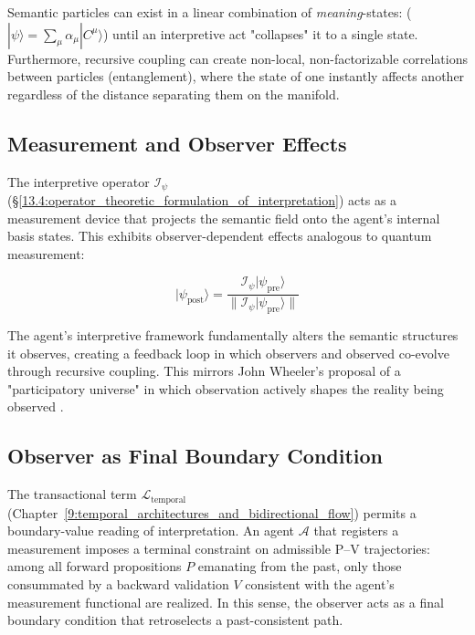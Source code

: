 Semantic particles can exist in a linear combination of \textit{meaning}-states: (\(|\psi\rangle = \sum_\mu \alpha_\mu |C^\mu\rangle\)) until an interpretive act "collapses" it to a single state. Furthermore, recursive coupling can create non-local, non-factorizable correlations between particles (entanglement), where the state of one instantly affects another regardless of the distance separating them on the manifold.


\subsection{Measurement and Observer Effects}
\label{13.7.3:measurement_and_observer_effects}

The interpretive operator \(\mathcal{I}_{\psi}\) (\S\ref{13.4:operator_theoretic_formulation_of_interpretation}) acts as a measurement device that projects the semantic field onto the agent's internal basis states. This exhibits observer-dependent effects analogous to quantum measurement:

\begin{equation}
|\psi_{\text{post}}\rangle = \frac{\mathcal{I}_{\psi}|\psi_{\text{pre}}\rangle}{\|\mathcal{I}_{\psi}|\psi_{\text{pre}}\rangle\|}
\end{equation}

The agent's interpretive framework fundamentally alters the semantic structures it observes, creating a feedback loop in which observers and observed co-evolve through recursive coupling. This mirrors John Wheeler's proposal of a "participatory universe" in which observation actively shapes the reality being observed \autocite{Wheeler1990}.


\subsection{Observer as Final Boundary Condition}
\label{13.7.4:observer_as_final_boundary_condition}

The transactional term \(\mathcal{L}_{\text{temporal}}\) (Chapter~\ref{9:temporal_architectures_and_bidirectional_flow}) permits a boundary-value reading of interpretation. An agent \(\mathcal{A}\) that registers a measurement imposes a terminal constraint on admissible P–V trajectories: among all forward propositions \(P\) emanating from the past, only those consummated by a backward validation \(V\) consistent with the agent's measurement functional are realized. In this sense, the observer acts as a final boundary condition that retroselects a past-consistent path.

